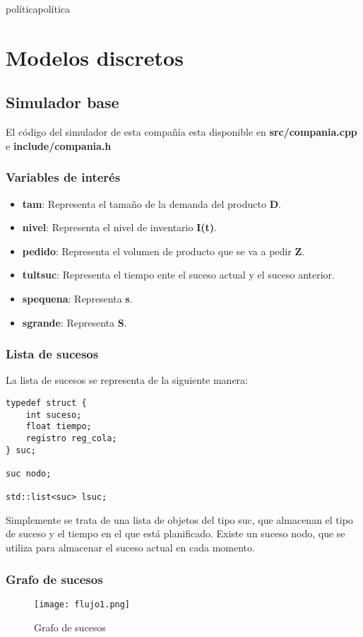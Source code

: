 políticapolítica\chapter{Modelos discretos}

\section{Simulador base}
El código del simulador de esta compañía esta disponible en \textbf{src/compania.cpp} e \textbf{include/compania.h}

\subsection{Variables de interés}
\begin{itemize}
	\item \textbf{tam}: Representa el tamaño de la demanda del producto \textbf{D}.
	\item \textbf{nivel}: Representa el nivel de inventario \textbf{I(t)}.
	\item \textbf{pedido}: Representa el volumen de producto  que se va a pedir \textbf{Z}.
	\item \textbf{tultsuc}: Representa el tiempo ente el suceso actual y el suceso anterior.
	\item \textbf{spequena}: Representa \textbf{s}.
	\item \textbf{sgrande}: Representa \textbf{S}.
\end{itemize}

\subsection{Lista de sucesos}
La lista de sucesos se representa de la siguiente manera:
\begin{verbatim}
typedef struct {
	int suceso;
	float tiempo;
	registro reg_cola;
} suc;

suc nodo;

std::list<suc> lsuc;
\end{verbatim}
Simplemente se trata de una lista de objetos del tipo suc, que almacenan el tipo de suceso y el tiempo en el que está planificado.
Existe un suceso nodo, que se utiliza para almacenar el suceso actual en cada momento.

\newpage

\subsection{Grafo de sucesos}
\begin{figure}[H]
	\centering
	\texttt{[image: flujo1.png]}
	\caption{Grafo de sucesos}
\end{figure}


